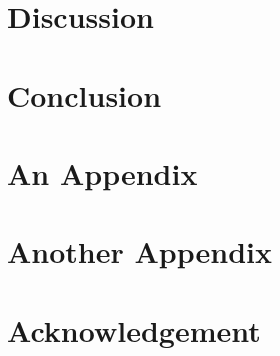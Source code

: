 \documentclass{senior-design}
\begin{document}
\chapter{Discussion}

\chapter{Conclusion}


\renewcommand*{\UrlFont}{\rmfamily}
\printbibliography[title={References},heading=bibintoc]

\appendix
\chapter{An Appendix}

\chapter{Another Appendix}

\backmatter
\chapter{Acknowledgement}

\end{document}
